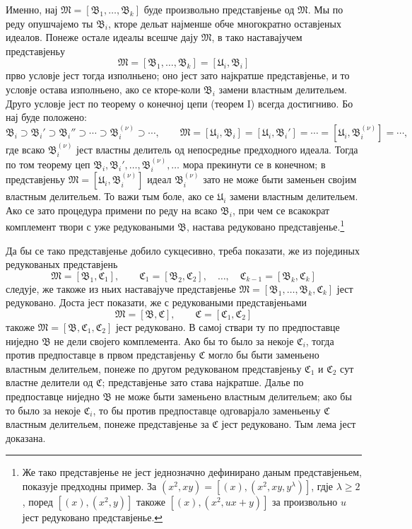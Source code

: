 ﻿\documentclass[11pt]{article}
\newcommand{\ideal}[1]{\mathfrak{#1}}
\begin{document}
Именно, нај \(\ideal M=[\ideal B_1,\ldots,\ideal B_k]\) буде произвольно представјенье од \(\ideal M\). Мы по реду опушчајемо ты \(\ideal B_i\), кторе дельат најменше обче многократно оставјеных идеалов. Понеже остале идеалы всешче дају \(\ideal M\), в тако наставајучем представјеньу
\[
 \ideal M=[\ideal B_1,\ldots,\ideal B_k]=[\ideal U_i,\ideal B_i]
\]
прво условје јест тогда изполньено; оно јест зато најкратше представјенье, и то условје остава изполньено, ако се кторе-коли \(\ideal B_i\) замени властным делительем. Друго условје јест по теорему о конечној цепи (теорем I) всегда достигниво. Бо нај буде положено:
\[
 \ideal B_i\supset \ideal B_i'\supset \ideal B_i''\supset\cdots\supset \ideal B_i^{(\nu)}\supset\cdots,
 \qquad
 \ideal M=[\ideal U_i,\ideal B_i]=[\ideal U_i,\ideal B_i']=\cdots=[\ideal U_i,\ideal B_i^{(\nu)}]=\cdots,
\]
где всако \(\ideal B_i^{(\nu)}\) јест властны делитель од непосреднье предходного идеала. Тогда по том теорему цеп \(\ideal B_i,\ideal B_i',\ldots,\ideal B_i^{(\nu)},\ldots\) мора прекинути се в конечном; в представјеньу \(\ideal M=[\ideal U_i,\ideal B_i^{(\nu)}]\) идеал \(\ideal B_i^{(\nu)}\) зато не може быти заменьен својим властным делительем. То важи тым боле, ако се \(\ideal U_i\) замени властным делительем. Ако се зато процедура примени по реду на всако \(\ideal B_i\), при чем се всакократ комплемент твори с уже редуковаными \(\ideal B\), настава редуковано представјенье.\footnote{Же тако представјенье не јест једнозначно дефинирано даным представјеньем, показује предходны пример. За \((x^2,xy)=[(x),(x^2,xy,y^\lambda)]\), гдје \(\lambda\ge2\), поред \([(x),(x^2,y)]\) такоже \([(x),(x^2,ux+y)]\) за произвольно \(u\) јест редуковано представјенье.}

Да бы се тако представјенье добило сукцесивно, треба показати, же из појединых редукованых представјень
\[
 \ideal M=[\ideal B_1,\ideal C_1],\qquad
 \ideal C_1=[\ideal B_2,\ideal C_2],\quad\ldots,\quad
 \ideal C_{k-1}=[\ideal B_k,\ideal C_k]
\]
следује, же такоже из ньих наставајуче представјенье \(\ideal M=[\ideal B_1,\ldots,\ideal B_k,\ideal C_k]\) јест редуковано. Доста јест показати, же с редуковаными представјеньами
\[
 \ideal M=[\ideal B,\ideal C],\qquad \ideal C=[\ideal C_1,\ideal C_2]
\]
такоже \(\ideal M=[\ideal B,\ideal C_1,\ideal C_2]\) јест редуковано. В самој ствари ту по предпоставце ниједно \(\ideal B\) не дели својего комплемента. Ако бы то было за некоје \(\ideal C_i\), тогда против предпоставце в првом представјеньу \(\ideal C\) могло бы быти заменьено властным делительем, понеже по другом редукованом представјеньу \(\ideal C_1\) и \(\ideal C_2\) сут властне делители од \(\ideal C\); представјенье зато става најкратше. Далье по предпоставце ниједно \(\ideal B\) не може быти заменьено властным делительем; ако бы то было за некоје \(\ideal C_i\), то бы против предпоставце одговарјало заменьеньу \(\ideal C\) властным делительем, понеже представјенье за \(\ideal C\) јест редуковано. Тым лема јест доказана.
\end{document}
